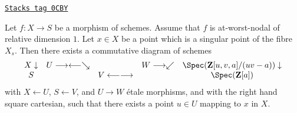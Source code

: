 \begin{lemma}
\label{curves-lemma-etale-local-structure-nodal-family}
\href{https://stacks.math.columbia.edu/tag/0CBY}{\texttt{Stacks tag 0CBY}}

Let $f : X \to S$ be a morphism of schemes. Assume that
$f$ is at-worst-nodal of relative dimension $1$. Let
$x \in X$ be a point which is a singular point of the
fibre $X_s$. Then there exists a commutative diagram of schemes
$$
\begin{array}{ccccc}X \downarrow & U \longrightarrow\longleftarrow\searrow &  & W \longrightarrow\swarrow & \Spec(\mathbf{Z}[u, v, a]/(uv - a)) \downarrow \\ S &  & V \longleftarrow\longrightarrow &  & \Spec(\mathbf{Z}[a])\end{array}
$$
with $X \leftarrow U$, $S \leftarrow V$, and $U \to W$ \'etale morphisms,
and with the right hand square cartesian, such that there exists
a point $u \in U$ mapping to $x$ in $X$.
\end{lemma}

